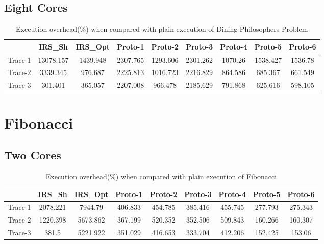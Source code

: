 \newpage
\subsection{Eight Cores}
\begin{table}[h]
\begin{center}
 \begin{tabular}{|c c c c c c c c c|} 
 \hline
 & IRS\_Sh & IRS\_Opt& Proto-1 & Proto-2 & Proto-3 & Proto-4 & Proto-5 & Proto-6\\ %
 \hline
Trace-1 & 13078.157 & 1439.948 & 2307.765 & 1293.606 & 2301.262 & 1070.26 & 1538.427 & 1536.78\\
Trace-2 & 3339.345 & 976.687 & 2225.813 & 1016.723 & 2216.829 & 864.586 & 685.367 & 661.549\\
Trace-3 & 301.401 & 365.057 & 2207.008 & 966.478 & 2185.629 & 791.868 & 625.616 & 598.105\\
\hline
\end{tabular}
\end{center}
\caption{Execution overhead(\%) when compared with plain execution of Dining Philosophers Problem}
\label{dining_phil_irs_res_cores_8}
\end{table}

\section{Fibonacci}

\subsection{Two Cores}
\begin{table}[h]
\begin{center}
 \begin{tabular}{|c c c c c c c c c|} 
 \hline
 & IRS\_Sh & IRS\_Opt& Proto-1 & Proto-2 & Proto-3 & Proto-4 & Proto-5 & Proto-6\\ %
 \hline
Trace-1 & 2078.221 & 7944.79 & 406.833 & 454.785 & 385.416 & 455.745 & 277.793 & 275.343\\
Trace-2 & 1220.398 & 5673.862 & 367.199 & 520.352 & 352.506 & 509.843 & 160.266 & 160.307\\
Trace-3 & 381.5 & 5221.922 & 351.029 & 416.653 & 333.704 & 412.206 & 152.425 & 153.06\\
\hline
\end{tabular}
\end{center}
\caption{Execution overhead(\%) when compared with plain execution of Fibonacci}
\label{fibonacci_irs_res_cores_2}
\end{table}

